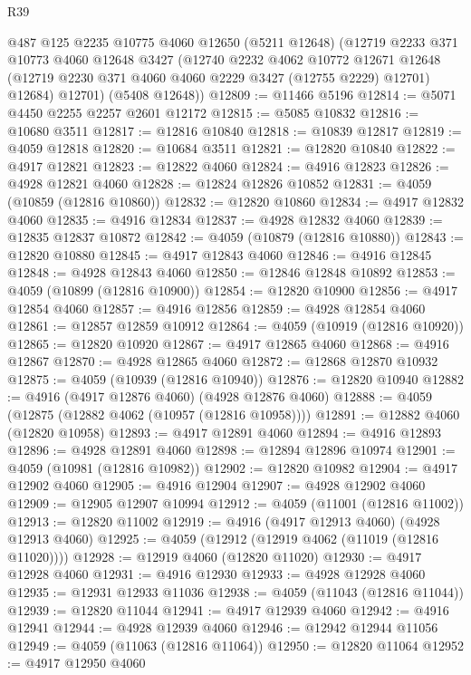 \begin{lexlean}{R39}
\begin{coremodule}
      @487
      @125
      @2235
      @10775
      @4060
      @12650
      (@5211 @12648)
      (@12719
        @2233
        @371
        @10773
        @4060
        @12648
        @3427
        (@12740
          @2232
          @4062
          @10772
          @12671
          @12648
          (@12719 @2230 @371 @4060 @4060 @2229 @3427 (@12755 @2229) @12701)
          @12684)
        @12701)
      (@5408 @12648))
@12809 := @11466 @5196
@12814 := @5071 @4450 @2255 @2257 @2601 @12172
@12815 := @5085 @10832
@12816 := @10680 @3511
@12817 := @12816 @10840
@12818 := @10839 @12817
@12819 := @4059 @12818
@12820 := @10684 @3511
@12821 := @12820 @10840
@12822 := @4917 @12821
@12823 := @12822 @4060
@12824 := @4916 @12823
@12826 := @4928 @12821 @4060
@12828 := @12824 @12826 @10852
@12831 := @4059 (@10859 (@12816 @10860))
@12832 := @12820 @10860
@12834 := @4917 @12832 @4060
@12835 := @4916 @12834
@12837 := @4928 @12832 @4060
@12839 := @12835 @12837 @10872
@12842 := @4059 (@10879 (@12816 @10880))
@12843 := @12820 @10880
@12845 := @4917 @12843 @4060
@12846 := @4916 @12845
@12848 := @4928 @12843 @4060
@12850 := @12846 @12848 @10892
@12853 := @4059 (@10899 (@12816 @10900))
@12854 := @12820 @10900
@12856 := @4917 @12854 @4060
@12857 := @4916 @12856
@12859 := @4928 @12854 @4060
@12861 := @12857 @12859 @10912
@12864 := @4059 (@10919 (@12816 @10920))
@12865 := @12820 @10920
@12867 := @4917 @12865 @4060
@12868 := @4916 @12867
@12870 := @4928 @12865 @4060
@12872 := @12868 @12870 @10932
@12875 := @4059 (@10939 (@12816 @10940))
@12876 := @12820 @10940
@12882 := @4916 (@4917 @12876 @4060) (@4928 @12876 @4060)
@12888 := @4059 (@12875 (@12882 @4062 (@10957 (@12816 @10958))))
@12891 := @12882 @4060 (@12820 @10958)
@12893 := @4917 @12891 @4060
@12894 := @4916 @12893
@12896 := @4928 @12891 @4060
@12898 := @12894 @12896 @10974
@12901 := @4059 (@10981 (@12816 @10982))
@12902 := @12820 @10982
@12904 := @4917 @12902 @4060
@12905 := @4916 @12904
@12907 := @4928 @12902 @4060
@12909 := @12905 @12907 @10994
@12912 := @4059 (@11001 (@12816 @11002))
@12913 := @12820 @11002
@12919 := @4916 (@4917 @12913 @4060) (@4928 @12913 @4060)
@12925 := @4059 (@12912 (@12919 @4062 (@11019 (@12816 @11020))))
@12928 := @12919 @4060 (@12820 @11020)
@12930 := @4917 @12928 @4060
@12931 := @4916 @12930
@12933 := @4928 @12928 @4060
@12935 := @12931 @12933 @11036
@12938 := @4059 (@11043 (@12816 @11044))
@12939 := @12820 @11044
@12941 := @4917 @12939 @4060
@12942 := @4916 @12941
@12944 := @4928 @12939 @4060
@12946 := @12942 @12944 @11056
@12949 := @4059 (@11063 (@12816 @11064))
@12950 := @12820 @11064
@12952 := @4917 @12950 @4060

\end{coremodule}
\end{lexlean}
